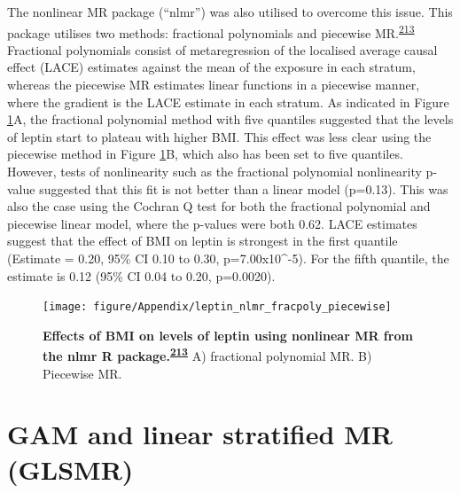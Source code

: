 \documentclass[11pt,twoside]{bristolthesis}
\begin{document}
The nonlinear MR package (``nlmr'') was also utilised to overcome this issue. This package utilises two methods: fractional polynomials and piecewise MR.\textsuperscript{\protect\hyperlink{ref-Staley2017}{213}} Fractional polynomials consist of metaregression of the localised average causal effect (LACE) estimates against the mean of the exposure in each stratum, whereas the piecewise MR estimates linear functions in a piecewise manner, where the gradient is the LACE estimate in each stratum. As indicated in Figure \ref{fig:leptin-nlmr}A, the fractional polynomial method with five quantiles suggested that the levels of leptin start to plateau with higher BMI. This effect was less clear using the piecewise method in Figure \ref{fig:leptin-nlmr}B, which also has been set to five quantiles. However, tests of nonlinearity such as the fractional polynomial nonlinearity p-value suggested that this fit is not better than a linear model (p=0.13). This was also the case using the Cochran Q test for both the fractional polynomial and piecewise linear model, where the p-values were both 0.62. LACE estimates suggest that the effect of BMI on leptin is strongest in the first quantile (Estimate = 0.20, 95\% CI 0.10 to 0.30, p=7.00x10\^{}-5). For the fifth quantile, the estimate is 0.12 (95\% CI 0.04 to 0.20, p=0.0020).



\begin{figure}
\texttt{[image: figure/Appendix/leptin\_nlmr\_fracpoly\_piecewise]} \caption[Effects of BMI on levels of leptin using nonlinear MR]{\textbf{Effects of BMI on levels of leptin using nonlinear MR from the nlmr R package.\textsuperscript{\protect\hyperlink{ref-Staley2017}{213}}} A) fractional polynomial MR. B) Piecewise MR.}\label{fig:leptin-nlmr}
\end{figure}
\hypertarget{gam-and-linear-stratified-mr-glsmr}{%
\section{GAM and linear stratified MR (GLSMR)}\label{gam-and-linear-stratified-mr-glsmr}}
\end{document}
